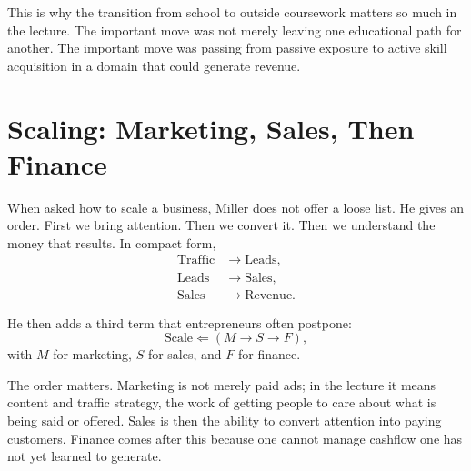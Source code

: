 This is why the transition from school to outside coursework matters so much in the lecture. The important move was not merely leaving one educational path for another. The important move was passing from passive exposure to active skill acquisition in a domain that could generate revenue.

\section{Scaling: Marketing, Sales, Then Finance}

When asked how to scale a business, Miller does not offer a loose list. He gives an order. First we bring attention. Then we convert it. Then we understand the money that results. In compact form,
\begin{align}
\text{Traffic} &\to \text{Leads},\\
\text{Leads} &\to \text{Sales},\\
\text{Sales} &\to \text{Revenue}.
\end{align}

He then adds a third term that entrepreneurs often postpone:
\begin{equation}
\text{Scale} \Leftarrow (M \to S \to F),
\end{equation}
with \(M\) for marketing, \(S\) for sales, and \(F\) for finance.

The order matters. Marketing is not merely paid ads; in the lecture it means content and traffic strategy, the work of getting people to care about what is being said or offered. Sales is then the ability to convert attention into paying customers. Finance comes after this because one cannot manage cashflow one has not yet learned to generate.

\begin{figure}[h]
\centering
{}
\end{figure}

